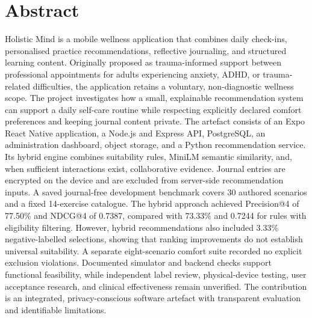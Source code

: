 \section*{Abstract}

Holistic Mind is a mobile wellness application that combines daily check-ins, personalised practice recommendations, reflective journaling, and structured learning content. Originally proposed as trauma-informed support between professional appointments for adults experiencing anxiety, ADHD, or trauma-related difficulties, the application retains a voluntary, non-diagnostic wellness scope. The project investigates how a small, explainable recommendation system can support a daily self-care routine while respecting explicitly declared comfort preferences and keeping journal content private. The artefact consists of an Expo React Native application, a Node.js and Express API, PostgreSQL, an administration dashboard, object storage, and a Python recommendation service. Its hybrid engine combines suitability rules, MiniLM semantic similarity, and, when sufficient interactions exist, collaborative evidence. Journal entries are encrypted on the device and are excluded from server-side recommendation inputs. A saved journal-free development benchmark covers 30 authored scenarios and a fixed 14-exercise catalogue. The hybrid approach achieved Precision@4 of 77.50\% and NDCG@4 of 0.7387, compared with 73.33\% and 0.7244 for rules with eligibility filtering. However, hybrid recommendations also included 3.33\% negative-labelled selections, showing that ranking improvements do not establish universal suitability. A separate eight-scenario comfort suite recorded no explicit exclusion violations. Documented simulator and backend checks support functional feasibility, while independent label review, physical-device testing, user acceptance research, and clinical effectiveness remain unverified. The contribution is an integrated, privacy-conscious software artefact with transparent evaluation and identifiable limitations.
